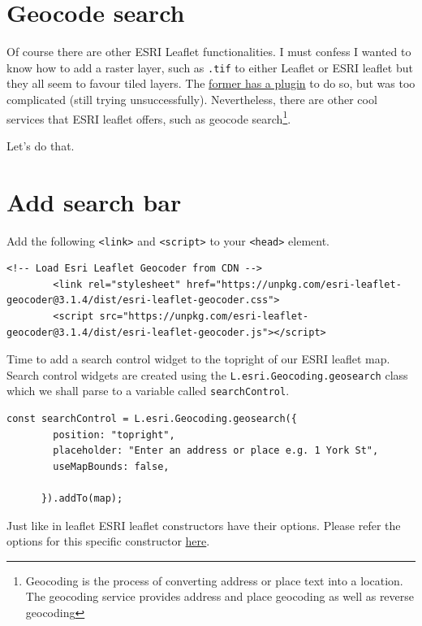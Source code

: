 \documentclass[
]{book}
\begin{document}
\hypertarget{geocode-search}{%
\section{Geocode search}\label{geocode-search}}

Of course there are other ESRI Leaflet functionalities. I must confess I wanted to know how to add a raster layer, such as \texttt{.tif} to either Leaflet or ESRI leaflet but they all seem to favour tiled layers. The \href{https://github.com/GeoTIFF/georaster-layer-for-leaflet}{former has a plugin} to do so, but was too complicated (still trying unsuccessfully). Nevertheless, there are other cool services that ESRI leaflet offers, such as geocode search\footnote{Geocoding is the process of converting address or place text into a location. The geocoding service provides address and place geocoding as well as reverse geocoding}.

Let's do that.

\hypertarget{add-search-bar}{%
\section{Add search bar}\label{add-search-bar}}

Add the following \texttt{\textless{}link\textgreater{}} and \texttt{\textless{}script\textgreater{}} to your \texttt{\textless{}head\textgreater{}} element.

\begin{verbatim}
<!-- Load Esri Leaflet Geocoder from CDN -->
        <link rel="stylesheet" href="https://unpkg.com/esri-leaflet-geocoder@3.1.4/dist/esri-leaflet-geocoder.css">
        <script src="https://unpkg.com/esri-leaflet-geocoder@3.1.4/dist/esri-leaflet-geocoder.js"></script>
\end{verbatim}

Time to add a search control widget to the topright of our ESRI leaflet map. Search control widgets are created using the \texttt{L.esri.Geocoding.geosearch} class which we shall parse to a variable called \texttt{searchControl}.

\begin{verbatim}
const searchControl = L.esri.Geocoding.geosearch({
        position: "topright",
        placeholder: "Enter an address or place e.g. 1 York St",
        useMapBounds: false,

      }).addTo(map);
\end{verbatim}

Just like in leaflet ESRI leaflet constructors have their options. Please refer the options for this specific constructor \href{https://developers.arcgis.com/esri-leaflet/api-reference/controls/geosearch/}{here}.
\end{document}
